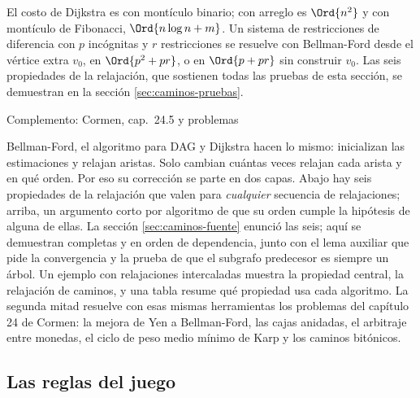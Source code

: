\documentclass[11pt,letterpaper]{article}
\begin{document}
El costo de Dijkstra es con montículo binario; con arreglo es
$\Ord{n^2}$ y con montículo de Fibonacci, $\Ord{n \log n + m}$. Un
sistema de restricciones de diferencia con $p$ incógnitas y $r$
restricciones se resuelve con Bellman-Ford desde el vértice extra
$v_0$, en $\Ord{p^2 + pr}$, o en $\Ord{p + pr}$ sin construir $v_0$.
Las seis propiedades de la relajación, que sostienen todas las
pruebas de esta sección, se demuestran en la sección
\ref{sec:caminos-pruebas}.

\newpage


%
  {Complemento: Cormen, cap.\ 24.5 y problemas}
\label{sec:caminos-pruebas}

\begin{quick_sum}
  Bellman-Ford, el algoritmo para DAG y Dijkstra hacen lo mismo:
  inicializan las estimaciones y relajan aristas. Solo cambian
  cuántas veces relajan cada arista y en qué orden. Por eso su
  corrección se parte en dos capas. Abajo hay seis propiedades de la
  relajación que valen para \emph{cualquier} secuencia de
  relajaciones; arriba, un argumento corto por algoritmo de que su
  orden cumple la hipótesis de alguna de ellas. La sección
  \ref{sec:caminos-fuente} enunció las seis; aquí se demuestran
  completas y en orden de dependencia, junto con el lema auxiliar que
  pide la convergencia y la prueba de que el subgrafo predecesor es
  siempre un árbol. Un ejemplo con relajaciones intercaladas muestra
  la propiedad central, la relajación de caminos, y una tabla resume
  qué propiedad usa cada algoritmo. La segunda mitad resuelve con esas
  mismas herramientas los problemas del capítulo 24 de Cormen: la
  mejora de Yen a Bellman-Ford, las cajas anidadas, el arbitraje entre
  monedas, el ciclo de peso medio mínimo de Karp y los caminos
  bitónicos.
\end{quick_sum}


\subsection*{Las reglas del juego}
\end{document}
